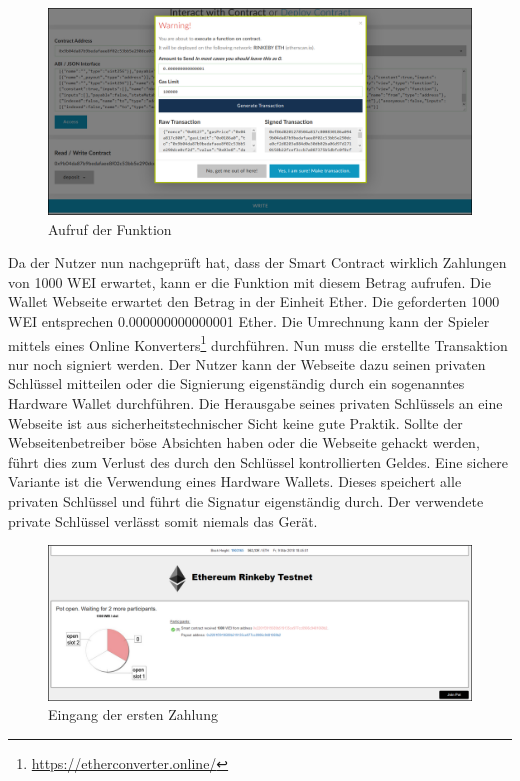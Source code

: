 \begin{figure}[H]
\centering
\includegraphics[width=1\linewidth]{Figures/eth_gui/ETH_wallet_deposit}
\decoRule
\caption{Aufruf der  Funktion}
\label{fig:ETH_wallet_deposit}
\end{figure}

Da der Nutzer nun nachgeprüft hat, dass der Smart Contract wirklich Zahlungen von 1000 WEI erwartet, kann er die  Funktion mit diesem Betrag aufrufen.
Die Wallet Webseite erwartet den Betrag in der Einheit Ether. Die geforderten 1000 WEI entsprechen 0.000000000000001 Ether. Die Umrechnung kann der Spieler mittels eines Online Konverters\footnote{\url{https://etherconverter.online/}} durchführen.
Nun muss die erstellte Transaktion nur noch signiert werden. Der Nutzer kann der Webseite dazu seinen privaten Schlüssel mitteilen oder die Signierung eigenständig durch ein sogenanntes Hardware Wallet durchführen. Die Herausgabe seines privaten Schlüssels an eine Webseite ist aus sicherheitstechnischer Sicht keine gute Praktik. Sollte der Webseitenbetreiber böse Absichten haben oder die Webseite gehackt werden, führt dies zum Verlust des durch den Schlüssel kontrollierten Geldes. Eine sichere Variante ist die Verwendung eines Hardware Wallets. Dieses speichert alle privaten Schlüssel und führt die Signatur eigenständig durch. Der verwendete private Schlüssel verlässt somit niemals das Gerät. 

\begin{figure}[H]
\centering
\includegraphics[width=1\linewidth]{Figures/eth_gui/ETH_pot_1}
\decoRule
\caption{Eingang der ersten Zahlung}
\label{fig:ETH_pot_1}
\end{figure}


